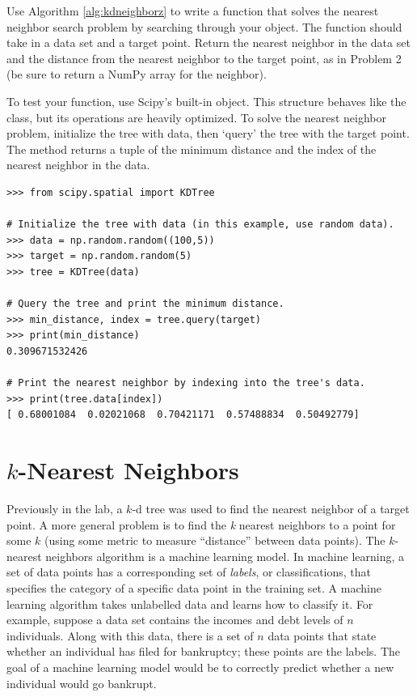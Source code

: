 \begin{problem} %
Use Algorithm \ref{alg:kdneighborz} to write a function that solves the nearest neighbor search problem by searching through your  object.
The function should take in a data set and a target point.
Return the nearest neighbor in the data set and the distance from the nearest neighbor to the target point, as in Problem 2 (be sure to return a NumPy array for the neighbor).

To test your function, use Scipy's built-in  object.
This structure behaves like the  class, but its operations are heavily optimized.
To solve the nearest neighbor problem, initialize the tree with data, then `query' the tree with the target point.
The  method returns a tuple of the minimum distance and the index of the nearest neighbor in the data.

\begin{lstlisting}
>>> from scipy.spatial import KDTree

# Initialize the tree with data (in this example, use random data).
>>> data = np.random.random((100,5))
>>> target = np.random.random(5)
>>> tree = KDTree(data)

# Query the tree and print the minimum distance.
>>> min_distance, index = tree.query(target)
>>> print(min_distance)
0.309671532426

# Print the nearest neighbor by indexing into the tree's data.
>>> print(tree.data[index])
[ 0.68001084  0.02021068  0.70421171  0.57488834  0.50492779]
\end{lstlisting}
\end{problem}

\section*{$k$-Nearest Neighbors}
Previously in the lab, a $k$-d tree was used to find the nearest neighbor of a target point.
A more general problem is to find the \emph{k} nearest neighbors to a point for some $k$ (using some metric to measure ``distance'' between data points).
The $k$-nearest neighbors algorithm is a machine learning model. %
In machine learning, a set of data points has a corresponding set of \emph{labels}, or classifications, that specifies the category of a specific data point in the training set. A machine learning algorithm takes unlabelled data and learns how to classify it.
For example, suppose a data set contains the incomes and debt levels of $n$ individuals. Along with this data, there is a set of $n$ data points that state whether an individual has filed for bankruptcy; these points are the labels. The goal of a machine learning model would be to correctly predict whether a new individual would go bankrupt.

